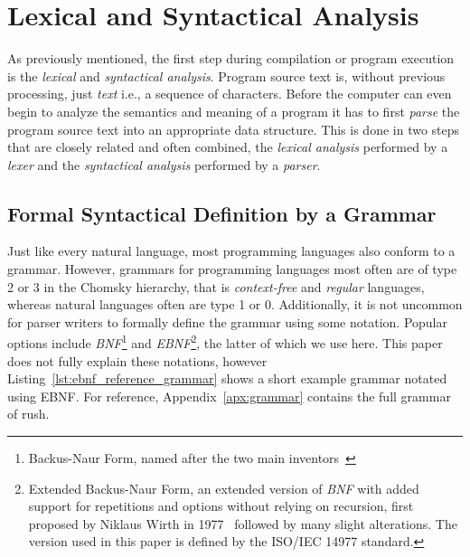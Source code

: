 \section{Lexical and Syntactical Analysis}

As previously mentioned, the first step during compilation or program execution is the \emph{lexical} and \emph{syntactical analysis}.
Program source text is, without previous processing, just \emph{text} i.e., a sequence of characters.
Before the computer can even begin to analyze the semantics and meaning of a program it has to first \emph{parse} the program source text into an appropriate data structure.
This is done in two steps that are closely related and often combined, the \emph{lexical analysis} performed by a \emph{lexer} and the \emph{syntactical analysis} performed by a \emph{parser}.

\subsection{Formal Syntactical Definition by a Grammar}

Just like every natural language, most programming languages also conform to a grammar.
However, grammars for programming languages most often are of type 2 or 3 in the Chomsky hierarchy, that is \emph{context-free} and \emph{regular} languages, whereas natural languages often are type 1 or 0.
Additionally, it is not uncommon for parser writers to formally define the grammar using some notation.
Popular options include \emph{BNF}\footnote{Backus-Naur Form, named after the two main inventors~\cite{Backus1960}} and \emph{EBNF}\footnote{Extended Backus-Naur Form, an extended version of \emph{BNF} with added support for repetitions and options without relying on recursion, first proposed by Niklaus Wirth in 1977~\cite{Wirth1977} followed by many slight alterations. The version used in this paper is defined by the ISO/IEC 14977 standard.}, the latter of which we use here.
This paper does not fully explain these notations, however Listing~\ref{lst:ebnf_reference_grammar} shows a short example grammar notated using EBNF.
For reference, Appendix~\ref{apx:grammar} contains the full grammar of rush.



